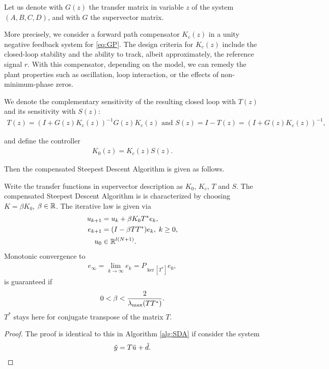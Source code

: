 Let us denote with $G(z)$ the transfer matrix in variable $z$ of the system $(A,B,C,D)$, and with $G$ the supervector matrix. 

More precisely, we consider a forward path compensator $K_c(z)$ in a unity negative feedback system for \eqref{eq:GP}. 
The design criteria for $K_c(z)$ include the closed-loop stability and the ability to track, albeit approximately, the reference signal $r$. With this compensator, depending on the model, we can remedy the plant properties such as oscillation, loop interaction, or the effects of non-minimum-phase zeros. 

We denote the complementary sensitivity of the resulting closed loop with $T(z)$ and its sensitivity with $S(z)$:
\begin{align}
T(z) = (I + G(z) K_c(z))^{-1}G(z) K_c(z) \text{ and } S(z)  = I - T(z) =  (I + G(z) K_c(z))^{-1}, 
\end{align}

and define the controller
\begin{align}
K_0(z) = K_c(z) S(z). 
\end{align}

Then the compensated Steepest Descent Algorithm is given as follows. 

\begin{alg}
	\label{alg: FBDesign}
	Write the transfer functions in supervector description as 
	$K_0$, $K_c$, $T$ and $S$. The compensated Steepest Descent Algorithm is  is characterized by choosing  $K = \beta K_0$, $\beta \in {\mathbb{R}}$. 
	The iterative law is given via 
	\begin{align}
	\label{eq:errFBDesign}
	\begin{split}
	u_{k+1} &= u_k + \beta K_0 T^* e_k, \\
	e_{k+1} &= (I- \beta T T^*) e_{k}, \; k\geq 0,\\
	u_0& \in {\mathbb{R}}^{l (N+1)}. 
	\end{split}	
	\end{align}
	Monotonic convergence to 
	\begin{align}
	\label{eq:FDErrLim} 
	e_\infty  = \lim_{k\to\infty} e_k = P_{\ker[T^*]}e_0,
	\end{align} 
	is guaranteed if
	\begin{align*}
	0 <\beta < \frac{2}{\lambda_{\mathrm{max}}(T T^*)}.
\end{align*}
$T^*$ stays here for conjugate transpose of the matrix $T$. 
\end{alg}
\begin{proof}
	The proof is identical to this in Algorithm \ref{alg:SDA} if consider the system 
	\begin{align}
	\tilde{y} = T\tilde{u} + \tilde{d}.
	\end{align}
\end{proof}

